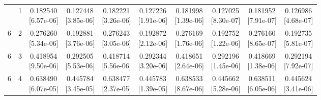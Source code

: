 \documentclass[12pt,letterpaper]{article}
\theoremstyle{plain}
\theoremstyle{definition}
\begin{document}
\begin{table}[p]
\begin{adjustbox}{max width=\linewidth}
\begin{tabular}{@{}rr*{8}{c}@{}}
\addlinespace[2pt]
6 & 1 & \shortstack{0.182540\\[-1pt]{\scriptsize[6.57e-06]}} & \shortstack{0.127448\\[-1pt]{\scriptsize[3.85e-06]}} & \shortstack{0.182221\\[-1pt]{\scriptsize[3.26e-06]}} & \shortstack{0.127226\\[-1pt]{\scriptsize[1.91e-06]}} & \shortstack{0.181998\\[-1pt]{\scriptsize[1.39e-06]}} & \shortstack{0.127025\\[-1pt]{\scriptsize[8.30e-07]}} & \shortstack{0.181952\\[-1pt]{\scriptsize[7.91e-07]}} & \shortstack{0.126986\\[-1pt]{\scriptsize[4.68e-07]}}\\
6 & 2 & \shortstack{0.276260\\[-1pt]{\scriptsize[5.34e-06]}} & \shortstack{0.192881\\[-1pt]{\scriptsize[3.76e-06]}} & \shortstack{0.276243\\[-1pt]{\scriptsize[3.05e-06]}} & \shortstack{0.192872\\[-1pt]{\scriptsize[2.12e-06]}} & \shortstack{0.276169\\[-1pt]{\scriptsize[1.76e-06]}} & \shortstack{0.192752\\[-1pt]{\scriptsize[1.22e-06]}} & \shortstack{0.276160\\[-1pt]{\scriptsize[8.65e-07]}} & \shortstack{0.192735\\[-1pt]{\scriptsize[5.81e-07]}}\\
6 & 3 & \shortstack{0.418954\\[-1pt]{\scriptsize[9.50e-06]}} & \shortstack{0.292505\\[-1pt]{\scriptsize[5.53e-06]}} & \shortstack{0.418714\\[-1pt]{\scriptsize[5.56e-06]}} & \shortstack{0.292344\\[-1pt]{\scriptsize[3.20e-06]}} & \shortstack{0.418651\\[-1pt]{\scriptsize[2.64e-06]}} & \shortstack{0.292196\\[-1pt]{\scriptsize[1.45e-06]}} & \shortstack{0.418669\\[-1pt]{\scriptsize[1.38e-06]}} & \shortstack{0.292194\\[-1pt]{\scriptsize[7.92e-07]}}\\
6 & 4 & \shortstack{0.638490\\[-1pt]{\scriptsize[6.07e-05]}} & \shortstack{0.445784\\[-1pt]{\scriptsize[3.45e-05]}} & \shortstack{0.638477\\[-1pt]{\scriptsize[2.37e-05]}} & \shortstack{0.445783\\[-1pt]{\scriptsize[1.39e-05]}} & \shortstack{0.638533\\[-1pt]{\scriptsize[8.67e-06]}} & \shortstack{0.445662\\[-1pt]{\scriptsize[5.28e-06]}} & \shortstack{0.638511\\[-1pt]{\scriptsize[6.05e-06]}} & \shortstack{0.445624\\[-1pt]{\scriptsize[3.41e-06]}}\\

\end{tabular}
\end{adjustbox}
\end{table}
\end{document}
